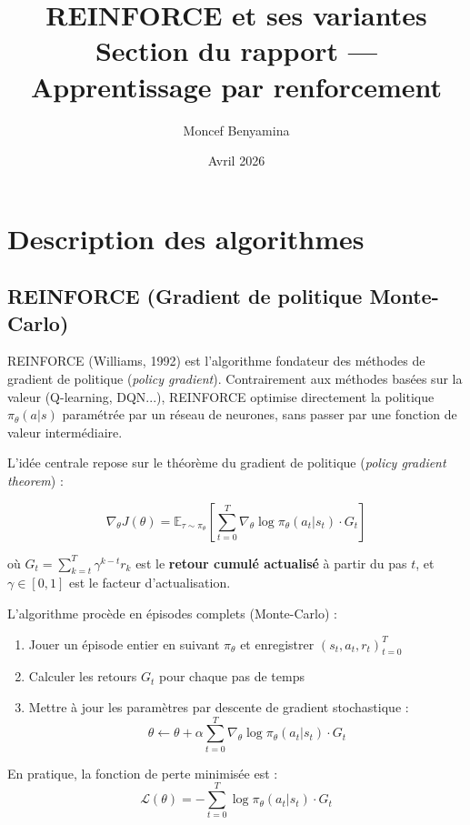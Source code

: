 \documentclass[12pt,a4paper]{article}
\title{\textbf{REINFORCE et ses variantes}\\
\large Section du rapport — Apprentissage par renforcement}
\author{Moncef Benyamina}
\date{Avril 2026}
\begin{document}
\maketitle
\tableofcontents
\newpage

\section{Description des algorithmes}

\subsection{REINFORCE (Gradient de politique Monte-Carlo)}

REINFORCE (Williams, 1992) est l'algorithme fondateur des méthodes de gradient de politique (\textit{policy gradient}). Contrairement aux méthodes basées sur la valeur (Q-learning, DQN...), REINFORCE optimise directement la politique $\pi_\theta(a|s)$ paramétrée par un réseau de neurones, sans passer par une fonction de valeur intermédiaire.

L'idée centrale repose sur le théorème du gradient de politique (\textit{policy gradient theorem}) :

\[
\nabla_\theta J(\theta) = \mathbb{E}_{\tau \sim \pi_\theta}\left[\sum_{t=0}^{T} \nabla_\theta \log \pi_\theta(a_t|s_t) \cdot G_t\right]
\]

où $G_t = \sum_{k=t}^{T} \gamma^{k-t} r_k$ est le \textbf{retour cumulé actualisé} à partir du pas $t$, et $\gamma \in [0,1]$ est le facteur d'actualisation.

L'algorithme procède en épisodes complets (Monte-Carlo) :
\begin{enumerate}
    \item Jouer un épisode entier en suivant $\pi_\theta$ et enregistrer $(s_t, a_t, r_t)_{t=0}^T$
    \item Calculer les retours $G_t$ pour chaque pas de temps
    \item Mettre à jour les paramètres par descente de gradient stochastique :
    \[
    \theta \leftarrow \theta + \alpha \sum_{t=0}^{T} \nabla_\theta \log \pi_\theta(a_t|s_t) \cdot G_t
    \]
\end{enumerate}

En pratique, la fonction de perte minimisée est :
\[
\mathcal{L}(\theta) = -\sum_{t=0}^{T} \log \pi_\theta(a_t|s_t) \cdot G_t
\]
\end{document}
